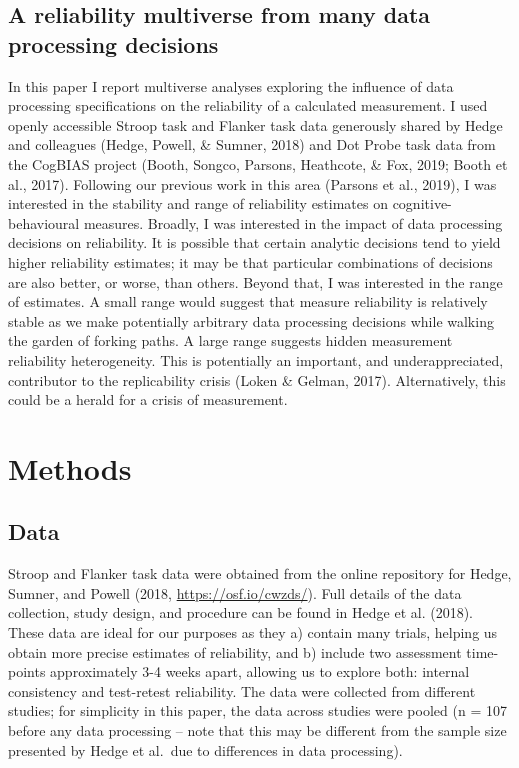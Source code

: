 \documentclass[
  man,floatsintext]{apa6}
\begin{document}
\hypertarget{a-reliability-multiverse-from-many-data-processing-decisions}{%
\subsection{A reliability multiverse from many data processing decisions}\label{a-reliability-multiverse-from-many-data-processing-decisions}}

In this paper I report multiverse analyses exploring the influence of data processing specifications on the reliability of a calculated measurement. I used openly accessible Stroop task and Flanker task data generously shared by Hedge and colleagues (Hedge, Powell, \& Sumner, 2018) and Dot Probe task data from the CogBIAS project (Booth, Songco, Parsons, Heathcote, \& Fox, 2019; Booth et al., 2017). Following our previous work in this area (Parsons et al., 2019), I was interested in the stability and range of reliability estimates on cognitive-behavioural measures. Broadly, I was interested in the impact of data processing decisions on reliability. It is possible that certain analytic decisions tend to yield higher reliability estimates; it may be that particular combinations of decisions are also better, or worse, than others. Beyond that, I was interested in the range of estimates. A small range would suggest that measure reliability is relatively stable as we make potentially arbitrary data processing decisions while walking the garden of forking paths. A large range suggests hidden measurement reliability heterogeneity. This is potentially an important, and underappreciated, contributor to the replicability crisis (Loken \& Gelman, 2017). Alternatively, this could be a herald for a crisis of measurement.

\hypertarget{methods}{%
\section{Methods}\label{methods}}

\hypertarget{data}{%
\subsection{Data}\label{data}}

Stroop and Flanker task data were obtained from the online repository for Hedge, Sumner, and Powell (2018, \url{https://osf.io/cwzds/}). Full details of the data collection, study design, and procedure can be found in Hedge et al. (2018). These data are ideal for our purposes as they a) contain many trials, helping us obtain more precise estimates of reliability, and b) include two assessment time-points approximately 3-4 weeks apart, allowing us to explore both: internal consistency and test-retest reliability. The data were collected from different studies; for simplicity in this paper, the data across studies were pooled (n = 107 before any data processing -- note that this may be different from the sample size presented by Hedge et al.~due to differences in data processing).
\end{document}
